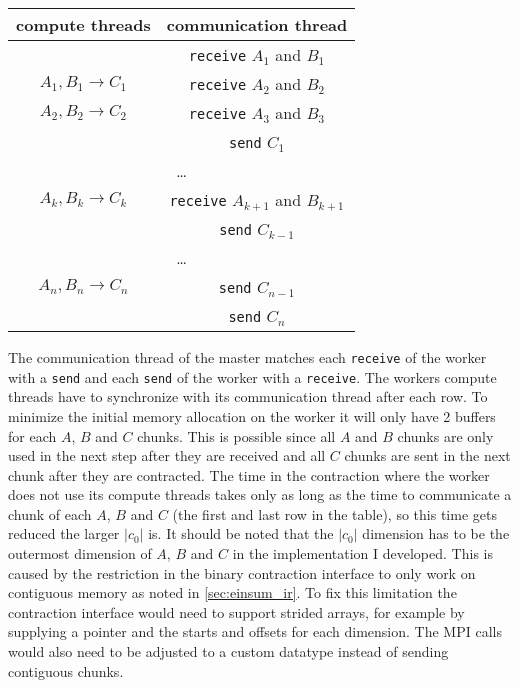 \begin{center}
  \begin{tabular}{ |c|c| } 
  \hline
  compute threads & communication thread\\
  \hline
   & \texttt{receive} $A_1$ and $B_1$\\
  \hline
  $A_1,B_1 \rightarrow C_1$ & \texttt{receive} $A_2$ and $B_2$\\
  \hline
  $A_2,B_2 \rightarrow C_2$ & \texttt{receive} $A_3$ and $B_3$\\
  & \texttt{send} $C_1$\\
  \hline
  \multicolumn{2}{|c|}{\dots}\\
  \hline
  $A_k,B_k \rightarrow C_k$ & \texttt{receive} $A_{k+1}$ and $B_{k+1}$\\
  & \texttt{send} $C_{k-1}$\\
  \hline
  \multicolumn{2}{|c|}{\dots}\\
  \hline
  $A_n,B_n \rightarrow C_n$ & \texttt{send} $C_{n-1}$\\
  \hline
  & \texttt{send} $C_n$\\
  \hline
\end{tabular}
\end{center}

The communication thread of the master matches each \texttt{receive} of the worker with a \texttt{send} and each \texttt{send} of the worker with a \texttt{receive}.
The workers compute threads have to synchronize with its communication thread after each row.
To minimize the initial memory allocation on the worker it will only have 2 buffers for each $A$, $B$ and $C$ chunks.
This is possible since all $A$ and $B$ chunks are only used in the next step after they are received and all $C$ chunks are sent in the next chunk after they are contracted.
The time in the contraction where the worker does not use its compute threads takes only as long as the time to communicate a chunk of each $A$, $B$ and $C$ (the first and last row in the table), so this time gets reduced the larger $|c_0|$ is.
It should be noted that the $|c_0|$ dimension has to be the outermost dimension of $A$, $B$ and $C$ in the implementation I developed.
This is caused by the restriction in the binary contraction interface to only work on contiguous memory as noted in \ref{sec:einsum_ir}.
To fix this limitation the contraction interface would need to support strided arrays, for example by supplying a pointer and the starts and offsets for each dimension.
The MPI calls would also need to be adjusted to a custom datatype instead of sending contiguous chunks.
